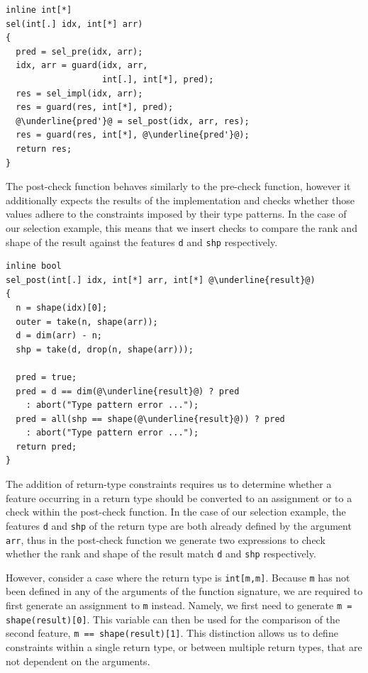 \documentclass[sigconf,screen]{acmart}
\begin{document}
\begin{lstlisting}[escapechar=@]
inline int[*]
sel(int[.] idx, int[*] arr)
{
  pred = sel_pre(idx, arr);
  idx, arr = guard(idx, arr,
                   int[.], int[*], pred);
  res = sel_impl(idx, arr);
  res = guard(res, int[*], pred);
  @\underline{pred'}@ = sel_post(idx, arr, res);
  res = guard(res, int[*], @\underline{pred'}@);
  return res;
}
\end{lstlisting}

The post-check function behaves similarly to the pre-check function, however it additionally expects the results of the implementation and checks whether those values adhere to the constraints imposed by their type patterns.
In the case of our selection example, this means that we insert checks to compare the rank and shape of the result against the features \texttt{d} and \texttt{shp} respectively.

\begin{lstlisting}[escapechar=@]
inline bool
sel_post(int[.] idx, int[*] arr, int[*] @\underline{result}@)
{
  n = shape(idx)[0];
  outer = take(n, shape(arr));
  d = dim(arr) - n;
  shp = take(d, drop(n, shape(arr)));

  pred = true;
  pred = d == dim(@\underline{result}@) ? pred
    : abort("Type pattern error ...");
  pred = all(shp == shape(@\underline{result}@)) ? pred
    : abort("Type pattern error ...");
  return pred;
}
\end{lstlisting}

The addition of return-type constraints requires us to determine whether a feature occurring in a return type should be converted to an assignment or to a check within the post-check function.
In the case of our selection example, the features \texttt{d} and \texttt{shp} of the return type are both already defined by the argument \texttt{arr}, thus in the post-check function we generate two expressions to check whether the rank and shape of the result match \texttt{d} and \texttt{shp} respectively.

However, consider a case where the return type is \texttt{int[m,m]}.
Because \texttt{m} has not been defined in any of the arguments of the function signature, we are required to first generate an assignment to \texttt{m} instead.
Namely, we first need to generate \texttt{m = shape(result)[0]}.
This variable can then be used for the comparison of the second feature, \texttt{m == shape(result)[1]}.
This distinction allows us to define constraints within a single return type, or between multiple return types, that are not dependent on the arguments.
\end{document}
